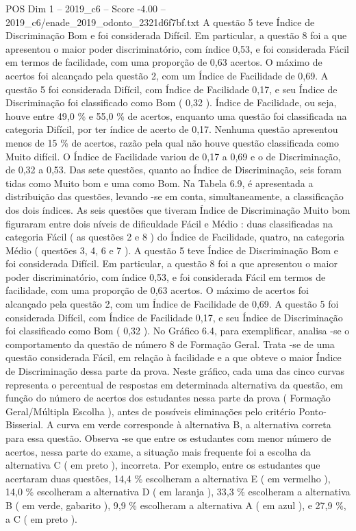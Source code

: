 \begin{textsample}{POS Dim 1 – 2019\_c6 – Score -4.00 – 2019\_c6/enade\_2019\_odonto\_2321d6f7bf.txt}
A questão 5 teve Índice de Discriminação Bom e foi considerada Difícil.
Em particular, a questão 8 foi a que apresentou o maior poder discriminatório, com índice 0,53, e foi considerada Fácil em termos de facilidade, com uma proporção de 0,63 acertos.
O máximo de acertos foi alcançado pela questão 2, com um Índice de Facilidade de 0,69.
A questão 5 foi considerada Difícil, com Índice de Facilidade 0,17, e seu Índice de Discriminação foi classificado como Bom ( 0,32 ).
Índice de Facilidade, ou seja, houve entre 49,0 \% e 55,0 \% de acertos, enquanto uma questão foi classificada na categoria Difícil, por ter índice de acerto de 0,17.
Nenhuma questão apresentou menos de 15 \% de acertos, razão pela qual não houve questão classificada como Muito difícil.
O Índice de Facilidade variou de 0,17 a 0,69 e o de Discriminação, de 0,32 a 0,53.
Das sete questões, quanto ao Índice de Discriminação, seis foram tidas como Muito bom e uma como Bom.
Na Tabela 6.9, é apresentada a distribuição das questões, levando -se em conta, simultaneamente, a classificação dos dois índices.
As seis questões que tiveram Índice de Discriminação Muito bom figuraram entre dois níveis de dificuldade Fácil e Médio : duas classificadas na categoria Fácil ( as questões 2 e 8 ) do Índice de Facilidade, quatro, na categoria Médio ( questões 3, 4, 6 e 7 ).
A questão 5 teve Índice de Discriminação Bom e foi considerada Difícil.
Em particular, a questão 8 foi a que apresentou o maior poder discriminatório, com índice 0,53, e foi considerada Fácil em termos de facilidade, com uma proporção de 0,63 acertos.
O máximo de acertos foi alcançado pela questão 2, com um Índice de Facilidade de 0,69.
A questão 5 foi considerada Difícil, com Índice de Facilidade 0,17, e seu Índice de Discriminação foi classificado como Bom ( 0,32 ).
No Gráfico 6.4, para exemplificar, analisa -se o comportamento da questão de número 8 de Formação Geral.
Trata -se de uma questão considerada Fácil, em relação à facilidade e a que obteve o maior Índice de Discriminação dessa parte da prova.
Neste gráfico, cada uma das cinco curvas representa o percentual de respostas em determinada alternativa da questão, em função do número de acertos dos estudantes nessa parte da prova ( Formação Geral/Múltipla Escolha ), antes de possíveis eliminações pelo critério Ponto-Bisserial.
A curva em verde corresponde à alternativa B, a alternativa correta para essa questão.
Observa -se que entre os estudantes com menor número de acertos, nessa parte do exame, a situação mais frequente foi a escolha da alternativa C ( em preto ), incorreta.
Por exemplo, entre os estudantes que acertaram duas questões, 14,4 \% escolheram a alternativa E ( em vermelho ), 14,0 \% escolheram a alternativa D ( em laranja ), 33,3 \% escolheram a alternativa B ( em verde, gabarito ), 9,9 \% escolheram a alternativa A ( em azul ), e 27,9 \%, a C ( em preto ).

\end{textsample}
